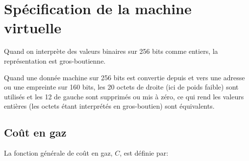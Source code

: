 \documentclass[9pt,oneside]{amsart}
\begin{document}
\section{Spécification de la machine virtuelle}\label{app:vm}

Quand on interprète des valeurs binaires sur 256 bits comme entiers, la représentation est gros-boutienne.

Quand une donnée machine sur 256 bits est convertie depuis et vers une adresse ou une empreinte sur 160 bits, les 20 octets de droite (ici de poids faible) sont utilisés et les 12 de gauche sont supprimés ou mis à zéro, ce qui rend les valeurs entières (les octets étant interprétés en gros-boutien) sont équivalents.

\subsection{Coût en gaz}

La fonction générale de coût en gaz, $C$, est définie par:
\end{document}
